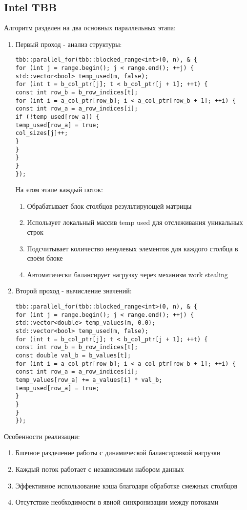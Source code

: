 \documentclass[12pt]{article}
\begin{document}
\subsection{Intel TBB}
Алгоритм разделен на два основных параллельных этапа:
\begin{enumerate}
\item Первый проход - анализ структуры:
\begin{lstlisting}
tbb::parallel_for(tbb::blocked_range<int>(0, n), & {
for (int j = range.begin(); j < range.end(); ++j) {
std::vector<bool> temp_used(m, false);
for (int t = b_col_ptr[j]; t < b_col_ptr[j + 1]; ++t) {
const int row_b = b_row_indices[t];
for (int i = a_col_ptr[row_b]; i < a_col_ptr[row_b + 1]; ++i) {
const int row_a = a_row_indices[i];
if (!temp_used[row_a]) {
temp_used[row_a] = true;
col_sizes[j]++;
}
}
}
}
});
\end{lstlisting}
На этом этапе каждый поток:
\begin{enumerate}
\item Обрабатывает блок столбцов результирующей матрицы
\item Использует локальный массив temp used для отслеживания уникальных строк
\item Подсчитывает количество ненулевых элементов для каждого столбца в своём блоке
\item Автоматически балансирует нагрузку через механизм work stealing
\end{enumerate}
\item Второй проход - вычисление значений:
\begin{lstlisting}
tbb::parallel_for(tbb::blocked_range<int>(0, n), & {
for (int j = range.begin(); j < range.end(); ++j) {
std::vector<double> temp_values(m, 0.0);
std::vector<bool> temp_used(m, false);
for (int t = b_col_ptr[j]; t < b_col_ptr[j + 1]; ++t) {
const int row_b = b_row_indices[t];
const double val_b = b_values[t];
for (int i = a_col_ptr[row_b]; i < a_col_ptr[row_b + 1]; ++i) {
const int row_a = a_row_indices[i];
temp_values[row_a] += a_values[i] * val_b;
temp_used[row_a] = true;
}
}
}
});
\end{lstlisting}
\end{enumerate}
Особенности реализации:
\begin{enumerate}
\item Блочное разделение работы с динамической балансировкой нагрузки
\item Каждый поток работает с независимым набором данных
\item Эффективное использование кэша благодаря обработке смежных столбцов
\item Отсутствие необходимости в явной синхронизации между потоками
\end{enumerate}
\end{document}
